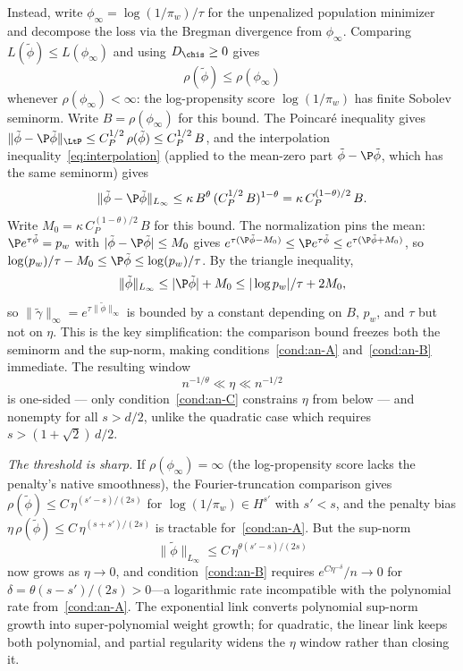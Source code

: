 \documentclass{article}
\begin{document}
Instead,
write $\phi_\infty = \log(1/\pi_w)/\tau$
for the unpenalized population minimizer
and decompose the loss
via the Bregman divergence
from $\phi_\infty$.
Comparing $L(\tilde\phi) \le L(\phi_\infty)$
and using $D_{\chis} \ge 0$ gives
\begin{equation}
\label{eq:entropy-comparison}
\rho(\tilde\phi) \le \rho(\phi_\infty)
\end{equation}
whenever $\rho(\phi_\infty) < \infty$:
the log-propensity score
$\log(1/\pi_w)$
has finite Sobolev seminorm.
Write $B = \rho(\phi_\infty)$ for this bound.
The Poincar\'e inequality gives
$\|\tilde\phi - \P\tilde\phi\|_{\LtP}
  \le C_P^{1/2}\, \rho(\tilde\phi)
  \le C_P^{1/2}\, B$,
and the interpolation inequality~\eqref{eq:interpolation}
(applied to the mean-zero part
$\tilde\phi - \P\tilde\phi$,
which has the same seminorm) gives
\[
\|\tilde\phi - \P\tilde\phi\|_{L_\infty}
  \le \kappa\, B^\theta\,
    (C_P^{1/2}\, B)^{1-\theta}
  = \kappa\, C_P^{(1-\theta)/2}\, B.
\]
Write $M_0 = \kappa\, C_P^{(1-\theta)/2}\, B$
for this bound.
The normalization pins the mean:
$\P e^{\tau\tilde\phi} = p_w$
with $|\tilde\phi - \P\tilde\phi| \le M_0$
gives
$e^{\tau(\P\tilde\phi - M_0)}
  \le \P e^{\tau\tilde\phi}
  \le e^{\tau(\P\tilde\phi + M_0)}$,
so $\log(p_w)/\tau - M_0
  \le \P\tilde\phi
  \le \log(p_w)/\tau$.
By the triangle inequality,
\begin{equation}\label{eq:tsm-entropy-supnorm}
\|\tilde\phi\|_{L_\infty}
  \le |\P\tilde\phi| + M_0
  \le |\log p_w|/\tau + 2M_0,
\end{equation}
so
$\|\tilde\gamma\|_\infty
  = e^{\tau\|\tilde\phi\|_\infty}$
is bounded
by a constant depending on $B$, $p_w$,
and $\tau$
but not on $\eta$.
This is the key simplification:
the comparison bound
freezes both the seminorm and the sup-norm,
making conditions~\ref{cond:an-A} and~\ref{cond:an-B} immediate.
The resulting window
\begin{equation}\label{eq:tsm-entropy-window}
n^{-1/\theta} \ll \eta \ll n^{-1/2}
\end{equation}
is one-sided ---
only condition~\ref{cond:an-C} constrains $\eta$
from below ---
and nonempty for all $s > d/2$,
unlike the quadratic case
which requires $s > (1+\sqrt{2})\,d/2$.

\emph{The threshold is sharp.}
If $\rho(\phi_\infty) = \infty$
(the log-propensity score
lacks the penalty's native smoothness),
the Fourier-truncation comparison
gives $\rho(\tilde\phi)
  \le C\,\eta^{(s'-s)/(2s)}$
for $\log(1/\pi_w) \in H^{s'}$
with $s' < s$,
and the penalty bias
$\eta\,\rho(\tilde\phi) \le C\,\eta^{(s+s')/(2s)}$
is tractable for~\ref{cond:an-A}.
But the sup-norm
\[
\|\tilde\phi\|_{L_\infty}
  \le C\,\eta^{\theta(s'-s)/(2s)}
\]
now grows as $\eta \to 0$,
and condition~\ref{cond:an-B} requires
$e^{C\eta^{-\delta}}/n \to 0$
for $\delta = \theta(s-s')/(2s) > 0$---a
logarithmic rate incompatible
with the polynomial rate from~\ref{cond:an-A}.
The exponential link converts
polynomial sup-norm growth
into super-polynomial weight growth;
for quadratic,
the linear link keeps both polynomial,
and partial regularity
widens the $\eta$ window
rather than closing it.
\end{document}
